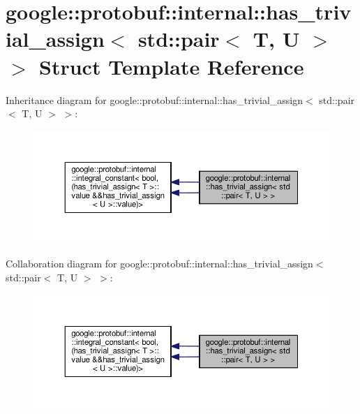 \hypertarget{structgoogle_1_1protobuf_1_1internal_1_1has__trivial__assign_3_01std_1_1pair_3_01T_00_01U_01_4_01_4}{}\section{google\+:\+:protobuf\+:\+:internal\+:\+:has\+\_\+trivial\+\_\+assign$<$ std\+:\+:pair$<$ T, U $>$ $>$ Struct Template Reference}
\label{structgoogle_1_1protobuf_1_1internal_1_1has__trivial__assign_3_01std_1_1pair_3_01T_00_01U_01_4_01_4}


Inheritance diagram for google\+:\+:protobuf\+:\+:internal\+:\+:has\+\_\+trivial\+\_\+assign$<$ std\+:\+:pair$<$ T, U $>$ $>$\+:
\nopagebreak
\begin{figure}[H]
\begin{center}
\leavevmode
\includegraphics[width=350pt]{structgoogle_1_1protobuf_1_1internal_1_1has__trivial__assign_3_01std_1_1pair_3_01T_00_01U_01_4_01_4__inherit__graph}
\end{center}
\end{figure}


Collaboration diagram for google\+:\+:protobuf\+:\+:internal\+:\+:has\+\_\+trivial\+\_\+assign$<$ std\+:\+:pair$<$ T, U $>$ $>$\+:
\nopagebreak
\begin{figure}[H]
\begin{center}
\leavevmode
\includegraphics[width=350pt]{structgoogle_1_1protobuf_1_1internal_1_1has__trivial__assign_3_01std_1_1pair_3_01T_00_01U_01_4_01_4__coll__graph}
\end{center}
\end{figure}
